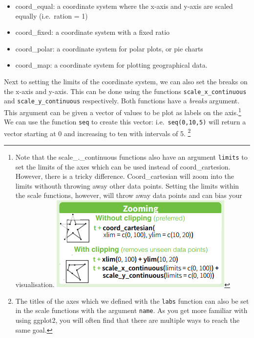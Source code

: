 \documentclass[]{tufte-book}
\providecommand{\tightlist}{%
  \setlength{\itemsep}{0pt}\setlength{\parskip}{0pt}}
\begin{document}
\begin{itemize}
\tightlist
\item
  coord\_equal: a coordinate system where the x-axis and y-axis are scaled equally (i.e.~ration = 1)
\item
  coord\_fixed: a coordinate system with a fixed ratio
\item
  coord\_polar: a coordinate system for polar plots, or pie charts
\item
  coord\_map: a coordinate system for plotting geographical data.
\end{itemize}

Next to setting the limits of the coordinate system, we can also set the breaks on the x-axis and y-axis. This can be done using the functions \texttt{scale\_x\_continuous} and \texttt{scale\_y\_continuous} respectively. Both functions have a \emph{breaks} argument. This argument can be given a vector of values to be plot as labels on the axis.\footnote{Note that the scale\_.\_continuous functions also have an argument \texttt{limits} to set the limits of the axes which can be used instead of coord\_cartesion. However, there is a tricky difference. Coord\_cartesian will zoom into the limits withouth throwing away other data points. Setting the limits within the scale functions, however, will throw away data points and can bias your visualisation. \includegraphics{images/zoom.png}} We can use the function \texttt{seq} to create this vector: i.e.~\texttt{seq(0,10,5)} will return a vector starting at 0 and increasing to ten with intervals of 5. \footnote{The titles of the axes which we defined with the \texttt{labs} function can also be set in the scale functions with the argument \texttt{name}. As you get more familiar with using ggplot2, you will often find that there are multiple ways to reach the same goal.}
\end{document}
